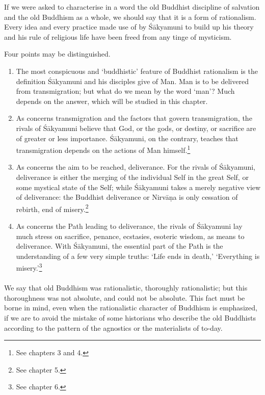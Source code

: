 \documentclass[a4paper, 11pt, oneside, english]{article}
\begin{document}
If we were asked to characterise in a word the old Buddhist discipline of salvation and the old Buddhism as a whole, we should say that it is a form of rationalism. Every idea and every practice made use of by Śākyamuni to build up his theory and his rule of religious life have been freed from any tinge of mysticism.

Four points may be distinguished.
\begin{enumerate}
    \item The most conspicuous and `buddhistic' feature of Buddhist rationalism is the definition Śākyamuni and his disciples give of Man. Man is to be delivered from transmigration; but what do we mean by the word `man'? Much depends on the answer, which will be studied in this chapter.

    \item As concerns transmigration and the factors that govern transmigration, the rivals of Śākyamuni believe that God, or the gods, or destiny, or sacrifice are of greater or less importance. Śākyamuni, on the contrary, teaches that transmigration depends on the actions of Man himself.\footnote{See chapters 3 and 4.}
    
    \item As concerns the aim to be reached, deliverance. For the rivals of Śākyamuni, deliverance is either the merging of the individual Self in the great Self, or some mystical state of the Self; while Śākyamuni takes a merely negative view of deliverance: the Buddhist deliverance or Nirvāṇa is only cessation of rebirth, end of misery.\footnote{See chapter 5.}
    
    \item As concerns the Path leading to deliverance, the rivals of Śākyamuni lay much stress on sacrifice, penance, ecstasies, esoteric wisdom, as means to deliverance. With Śākyamuni, the essential part of the Path is the understanding of a few very simple truths: `Life ends in death,' `Everything is misery.'\footnote{See chapter 6.}
\end{enumerate}
\paragraph{}
We say that old Buddhism was rationalistic, thoroughly rationalistic; but this thoroughness was not absolute, and could not be absolute. This fact must be borne in mind, even when the rationalistic character of Buddhism is emphasized, if we are to avoid the mistake of some historians who describe the old Buddhists according to the pattern of the agnostics or the materialists of to-day.
\end{document}
